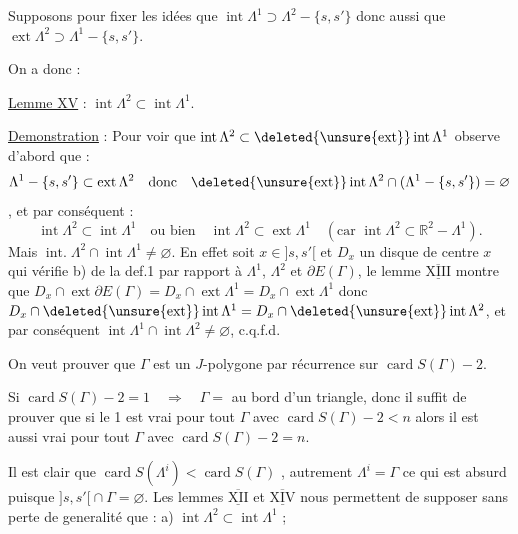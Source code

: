 Supposons pour fixer les idées que $\operatorname{int}\Lambda^1\supset\Lambda^2-\{s,s'\}$ donc aussi que $\operatorname{ext}\Lambda^2\supset\Lambda^1-\{s,s'\}$.

On a donc :

\uline{Lemme XV} : $\operatorname{int}\Lambda^2\subset\operatorname{int}\Lambda^1$.

\uline{Demonstration} : Pour voir que $\operatorname{int}\Lambda^2\subset\deleted{\unsure{\operatorname{ext}}}\operatorname{int}\Lambda^1$  observe d'abord que :
\[
\Lambda^1-\{s,s'\}\subset\operatorname{ext}\Lambda^2\quad\text{donc}\quad\deleted{\unsure{\operatorname{ext}}}\operatorname{int}\Lambda^2\cap(\Lambda^1-\{s,s'\})=\varnothing
\]
, et par conséquent :
\[
\operatorname{int}\Lambda^2\subset\operatorname{int}\Lambda^1\quad\text{ou bien}\quad\operatorname{int}\Lambda^2\subset\operatorname{ext}\Lambda^1\quad(\text{car }\operatorname{int}\Lambda^2\subset\mathbb R^2-\Lambda^1).
\]
Mais $\operatorname{int.}\Lambda^2\cap\operatorname{int}\Lambda^1\ne\varnothing$. En effet soit $x\in{]s,s'[}$ et $D_x$ un disque de centre $x$ qui vérifie b) de la def.1 par rapport à $\Lambda^1$, $\Lambda^2$ et $\partial E(\Gamma)$, le lemme $\underline{\overline{\mathrm{XIII}}}$ montre que $D_x\cap\operatorname{ext}\partial E(\Gamma)=D_x\cap\operatorname{ext}\Lambda^1=D_x\cap\operatorname{ext}\Lambda^1$ donc $D_x\cap\deleted{\unsure{\operatorname{ext}}}\operatorname{int}\Lambda^1=D_x\cap\deleted{\unsure{\operatorname{ext}}}\operatorname{int}\Lambda^2$, et par conséquent $\operatorname{int}\Lambda^1\cap\operatorname{int}\Lambda^2\ne\varnothing$, c.q.f.d.

On veut prouver que $\Gamma$ est un $J$-polygone par récurrence sur $\operatorname{card}S(\Gamma)-2$.

Si $\operatorname{card}S(\Gamma)-2=1\quad\Rightarrow\quad\Gamma={}$ au bord d'un triangle, donc il suffit de prouver que si le  1 est vrai pour tout $\Gamma$ avec $\operatorname{card}S(\Gamma)-2<n$ alors il est aussi vrai pour tout $\Gamma$ avec $\operatorname{card}S(\Gamma)-2=n$.

Il est clair que $\operatorname{card}S(\Lambda^i)<\operatorname{card}S(\Gamma)$ , autrement $\Lambda^i=\Gamma$ ce qui est absurd puisque $ {]s,s'[}\cap\Gamma=\varnothing$. Les lemmes $\underline{\overline{\mathrm{XII}}}$ et $\underline{\overline{\mathrm{XIV}}}$  nous permettent de supposer sans perte de generalité que : a) $\operatorname{int}\Lambda^2\subset\operatorname{int}\Lambda^1$ ;

